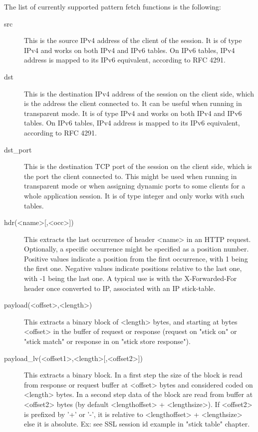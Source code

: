 The list of currently supported pattern fetch functions is the following:

\begin{description}
\item[src]
               This is the source IPv4 address of the client of the session.
               It is of type IPv4 and works on both IPv4 and IPv6 tables.
               On IPv6 tables, IPv4 address is mapped to its IPv6 equivalent,
               according to RFC 4291.

\item[dst]
               This is the destination IPv4 address of the session on the
               client side, which is the address the client connected to.
               It can be useful when running in transparent mode. It is of
               type IPv4 and works on both IPv4 and IPv6 tables.
               On IPv6 tables, IPv4 address is mapped to its IPv6 equivalent,
               according to RFC 4291.

\item[dst\_port]
               This is the destination TCP port of the session on the client
               side, which is the port the client connected to. This might be
               used when running in transparent mode or when assigning dynamic
               ports to some clients for a whole application session. It is of
               type integer and only works with such tables.

\item[{hdr(<name>[,<occ>])}]
               This extracts the last occurrence of header <name> in an HTTP
               request. Optionally, a specific occurrence might be specified as
               a position number. Positive values indicate a position from the
               first occurrence, with 1 being the first one. Negative values
               indicate positions relative to the last one, with -1 being the
               last one. A typical use is with the X-Forwarded-For header once
               converted to IP, associated with an IP stick-table.

\item[payload(<offset>,<length>)]
               This extracts a binary block of <length> bytes, and starting
               at bytes <offset> in the buffer of request or response (request
               on "stick on" or "stick match" or response in on "stick store
               response").

\item[{payload\_lv(<offset1>,<length>[,<offset2>])}]
               This extracts a binary block. In a first step the size of the
               block is read from response or request buffer at <offset>
               bytes and considered coded on <length> bytes. In a second step
               data of the block are read from buffer at <offset2> bytes
               (by default <lengthoffset> + <lengthsize>).
               If <offset2> is prefixed by '+' or '-', it is relative to
               <lengthoffset> + <lengthsize> else it is absolute.
               Ex: see SSL session id  example in "stick table" chapter.


\end{description}
